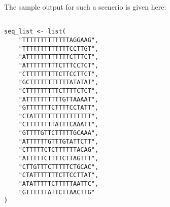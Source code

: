 The sample output for such a scenerio is given here:

\begin{lstlisting}

seq_list <- list(
    "TTTTTTTTTTTTTAGGAAG",
    "TTTTTTTTTTTTTCCTTGT",
    "ATTTTTTTTTTTTCTTTCT",
    "ATTTTTTTTTCTTTCCTCT",
    "CTTTTTTTTTCTTCCTTCT",
    "GCTTTTTTTTTTTATATAT",
    "CTTTTTTTTTCTTTTCTCT",
    "ATTTTTTTTTTGTTAAAAT",
    "GTTTTTTTCTTTTCCTATT",
    "CTATTTTTTTTTTTTTTTT",
    "CTTTTTTTTATTTCAAATT",
    "GTTTTGTTCTTTTTGCAAA",
    "ATTTTTTGTTTGTATTCTT",
    "CTTTTTCTCTTTTTTACAG",
    "ATTTTTCTTTTCTTAGTTT",
    "CTTGTTTCTTTTTCTGCAC",
    "CTATTTTTTTCTTCCTTAT",
    "ATATTTTTCTTTTTAATTC",
    "GTTTTTTATTCTTAACTTG"
)

\end{lstlisting}


